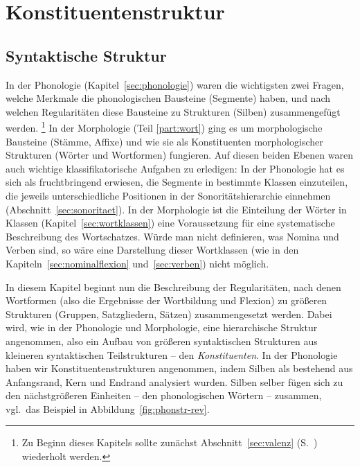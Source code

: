 \chapter{Konstituentenstruktur}


\newcommand{\COny}[2][-]{%
\POS[]+(0,-3);\POS[]+(0,-6)**\dir{#1} \POS[]+(0,-6);\POS[#2]+(0,-6)**\dir{#1}
\POS[#2]+(0,-6) \ar@{#1>}[#2]+(0,-3)}

\label{sec:konstituentenstruktur}

\section{Syntaktische Struktur}

\label{sec:syntaktischestruktur}

In der Phonologie (Kapitel~\ref{sec:phonologie}) waren die wichtigsten zwei Fragen, welche Merkmale die phonologischen Bausteine (Segmente) haben, und nach welchen Regularitäten diese Bausteine zu Strukturen (\zB Silben) zusammengefügt werden.%
\footnote{Zu Beginn dieses Kapitels sollte zunächst Abschnitt~\ref{sec:valenz} (S.~\pageref{sec:valenz}) wiederholt werden.}
In der Morphologie (Teil \ref{part:wort}) ging es um morphologische Bausteine (Stämme, Affixe) und wie sie als Konstituenten morphologischer Strukturen (Wörter und Wortformen) fungieren.
Auf diesen beiden Ebenen waren auch wichtige klassifikatorische Aufgaben zu erledigen:
In der Phonologie hat es sich \zB als fruchtbringend erwiesen, die Segmente in bestimmte Klassen einzuteilen, die jeweils unterschiedliche Positionen in der Sonoritätshierarchie einnehmen (Abschnitt~\ref{sec:sonoritaet}).
In der Morphologie ist die Einteilung der Wörter in Klassen (Kapitel~\ref{sec:wortklassen}) eine Voraussetzung für eine systematische Beschreibung des Wortschatzes.
Würde man nicht definieren, was \zB Nomina und Verben sind, so wäre eine Darstellung dieser Wortklassen (wie in den Kapiteln~\ref{sec:nominalflexion} und~\ref{sec:verben}) nicht möglich.

In diesem Kapitel beginnt nun die Beschreibung der Regularitäten, nach denen Wortformen (also die Ergebnisse der Wortbildung und Flexion) zu größeren Strukturen (Gruppen, Satzgliedern, Sätzen) zusammengesetzt werden.
Dabei wird, wie in der Phonologie und Morphologie, eine hierarchische Struktur angenommen, also ein Aufbau von größeren syntaktischen Strukturen aus kleineren syntaktischen Teilstrukturen -- den \textit{Konstituenten}.
In der Phonologie haben wir Konstituentenstrukturen angenommen, indem \zB Silben als bestehend aus Anfangsrand, Kern und Endrand analysiert wurden.
Silben selber fügen sich zu den nächstgrößeren Einheiten -- den phonologischen Wörtern -- zusammen, vgl.\ das Beispiel in Abbildung~\ref{fig:phonstr-rev}.

